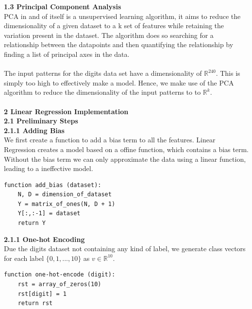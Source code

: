 \documentclass[a4paper]{article}
\begin{document}
\textbf{{\large 1.3 Principal Component Analysis}} \\

PCA in and of itself is a unsupervised learning algorithm, it aims to reduce the dimensionality of a given dataset to a k set of features while retaining the variation present in the dataset. The algorithm does so searching for a relationship between the datapoints and then quantifying the relationship by finding a list of principal axes in the data. \\ \\
The input patterns for the digits data set have a dimensionality of $\mathbb{R}^{240}$. This is simply too high to effectively make a model. Hence, we make use of the PCA algorithm to reduce the dimensionality of the input patterns to to $\mathbb{R}^{k}$. \\
\\

\textbf{{\Large 2 Linear Regression Implementation}} \\ 

\textbf{{\large 2.1 Preliminary Steps}} \\ 

\textbf{2.1.1 Adding Bias} \\

We first create a function to add a bias term to all the features. Linear Regression creates a model based on a offine function, which contains a bias term. Without the bias term we can only approximate the data using a linear function, leading to a ineffective model. \\

\begin{lstlisting}
function add_bias (dataset):
    N, D = dimension_of_dataset
    Y = matrix_of_ones(N, D + 1)
    Y[:,:-1] = dataset
    return Y
\end{lstlisting}


\textbf{2.1.1 One-hot Encoding} \\

Due the digits dataset not containing any kind of label, we generate class vectors for each label $\{0,1,...,10\}$ as $v \in \mathbb{R}^{10}$. \\

\begin{lstlisting}
function one-hot-encode (digit):
    rst = array_of_zeros(10)
    rst[digit] = 1
    return rst 
\end{lstlisting}
\qquad \\
\end{document}
